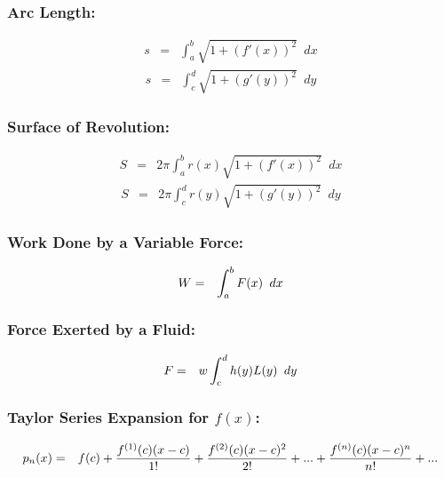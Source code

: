 \documentclass{article}[11pt]
\begin{document}
\pagebreak

\subsubsection*{\large{Arc Length:}}
\vspace{-0.25in}
\begin{eqnarray*}
s &=& \int_a^b{\sqrt{1+ (f'(x))^2}}\phantom{a}dx  
\end{eqnarray*}
\begin{eqnarray*}
s &=& \int_c^d{\sqrt{1+ (g'(y))^2}}\phantom{a}dy 
\end{eqnarray*}
\vspace{0.1in}

\subsubsection*{\large{Surface of Revolution:}}
\vspace{-0.25in}
\begin{eqnarray*}
S &=& 2\pi \int_a^b{r(x) \sqrt{1+ (f'(x))^2}}\phantom{a}dx  
\end{eqnarray*}
\begin{eqnarray*}
S &=& 2\pi \int_c^d{r(y) \sqrt{1+ (g'(y))^2}}\phantom{a}dy 
\end{eqnarray*}
\vspace{0.1in}

\subsubsection*{\large{Work Done by a Variable Force:}}
\begin{eqnarray*}
\vspace{-0.25in}
W &=& \int_a^b{F(x)}\phantom{a}dx  
\end{eqnarray*}
\vspace{0.1in}

\subsubsection*{\large{Force Exerted by a Fluid:}}
\begin{eqnarray*}
\vspace{-0.25in}
F &=& w \int_c^d{h(y) L(y)}\phantom{a}dy  
\end{eqnarray*}
\vspace{0.15in}

\subsubsection*{\large{Taylor Series Expansion for $f(x)$:}}
\begin{eqnarray*}
\vspace{-0.05in}
p_n(x) &=& f(c) + \frac{f^{(1)}(c)(x-c)}{1!} + \frac{f^{(2)}(c)(x-c)^2}{2!} + ... + \frac{f^{(n)}(c)(x-c)^n}{n!} + ... 
\end{eqnarray*}
\vspace{0.15in}
\end{document}
